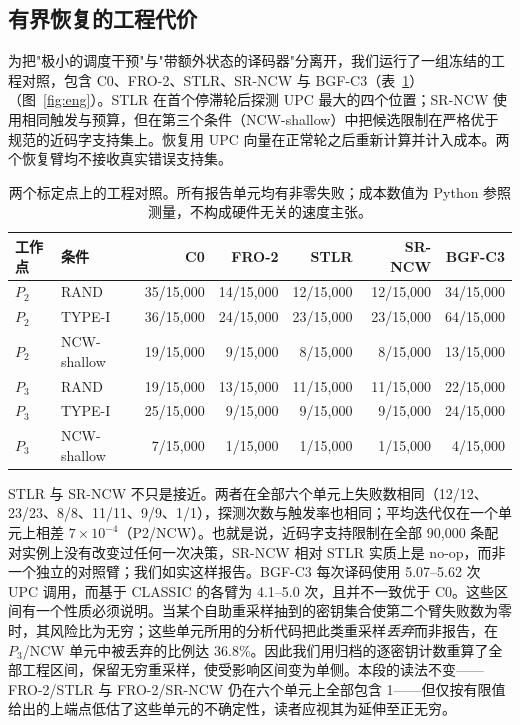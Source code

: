 \documentclass[UTF8,a4paper,10pt,twocolumn]{ctexart}
\begin{document}
\subsection{有界恢复的工程代价}\label{sec:engineering}

为把"极小的调度干预"与"带额外状态的译码器"分离开，我们运行了一组冻结的工程对照，包含 C0、FRO-2、STLR、SR-NCW 与 BGF-C3（表~\ref{tab:eng}）（图~\ref{fig:eng}）。STLR 在首个停滞轮后探测 UPC 最大的四个位置；SR-NCW 使用相同触发与预算，但在第三个条件（NCW-shallow）中把候选限制在严格优于规范的近码字支持集上。恢复用 UPC 向量在正常轮之后重新计算并计入成本。两个恢复臂均不接收真实错误支持集。

\begin{table}[t]
\centering
\caption{两个标定点上的工程对照。所有报告单元均有非零失败；成本数值为 Python 参照测量，不构成硬件无关的速度主张。}
\label{tab:eng}
\begin{tabular}{@{}llrrrrr@{}}
\toprule
工作点 & 条件 & C0 & FRO-2 & STLR & SR-NCW & BGF-C3 \\
\midrule
$P_2$ & RAND        & 35/15{,}000 & 14/15{,}000 & 12/15{,}000 & 12/15{,}000 & 34/15{,}000 \\
$P_2$ & TYPE-I      & 36/15{,}000 & 24/15{,}000 & 23/15{,}000 & 23/15{,}000 & 64/15{,}000 \\
$P_2$ & NCW-shallow & 19/15{,}000 & 9/15{,}000  & 8/15{,}000  & 8/15{,}000  & 13/15{,}000 \\
$P_3$ & RAND        & 19/15{,}000 & 13/15{,}000 & 11/15{,}000 & 11/15{,}000 & 22/15{,}000 \\
$P_3$ & TYPE-I      & 25/15{,}000 & 9/15{,}000  & 9/15{,}000  & 9/15{,}000  & 24/15{,}000 \\
$P_3$ & NCW-shallow & 7/15{,}000  & 1/15{,}000  & 1/15{,}000  & 1/15{,}000  & 4/15{,}000 \\
\bottomrule
\end{tabular}
\end{table}

STLR 与 SR-NCW 不只是接近。两者在全部六个单元上失败数相同（12/12、23/23、8/8、11/11、9/9、1/1），探测次数与触发率也相同；平均迭代仅在一个单元上相差 $7\times10^{-4}$（P2/NCW）。也就是说，近码字支持限制在全部 90{,}000 条配对实例上没有改变过任何一次决策，SR-NCW 相对 STLR 实质上是 no-op，而非一个独立的对照臂；我们如实这样报告。BGF-C3 每次译码使用 5.07--5.62 次 UPC 调用，而基于 CLASSIC 的各臂为 4.1--5.0 次，且并不一致优于 C0。这些区间有一个性质必须说明。当某个自助重采样抽到的密钥集合使第二个臂失败数为零时，其风险比为无穷；这些单元所用的分析代码把此类重采样\emph{丢弃}而非报告，在 $P_3$/NCW 单元中被丢弃的比例达 36.8\%。因此我们用归档的逐密钥计数重算了全部工程区间，保留无穷重采样，使受影响区间变为单侧。本段的读法不变——FRO-2/STLR 与 FRO-2/SR-NCW 仍在六个单元上全部包含 1——但仅按有限值给出的上端点低估了这些单元的不确定性，读者应视其为延伸至正无穷。
\end{document}
